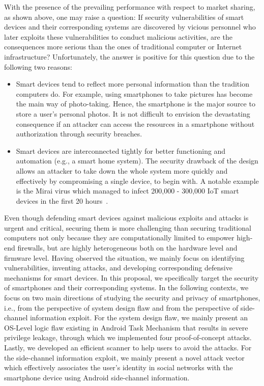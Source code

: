 \documentclass[letterpaper,12pt]{article}
\begin{document}
With the presence of the prevailing performance with respect to market sharing, as shown above, one may raise a question: If security vulnerabilities of smart devices and their corresponding systems are discovered by vicious personnel who later exploits these vulnerabilities to conduct malicious activities, are the consequences more serious than the ones of traditional computer or Internet infrastructure? Unfortunately, the answer is positive for this question due to the following two reasons:
\begin{itemize}
\item Smart devices tend to reflect more personal information than the tradition computers do. For example, using smartphones to take pictures has become the main way of photo-taking\cite{smartphonephoto}. Hence, the smartphone is the major source to store a user's personal photos. It is not difficult to envision the devastating consequence if an attacker can access the resources in a smartphone without authorization through security breaches.

\item Smart devices are interconnected tightly for better functioning and automation (e.g., a smart home system). The security drawback of the design allows an attacker to take down the whole system more quickly and effectively by compromising a single device, to begin with. A notable example is the Mirai virus which managed to infect 200,000 -
300,000 IoT smart devices in the first 20 hours~\cite{antonakakis2018mirai}.
\end{itemize}

Even though defending smart devices against malicious exploits and attacks is urgent and critical, securing them is more challenging than securing traditional computers not only because they are computationally limited to empower high-end firewalls, but are highly heterogeneous both on the hardware level and firmware level. Having observed the situation,  we mainly focus on identifying vulnerabilities, inventing attacks, and developing corresponding defensive mechanisms for smart devices. In this proposal, we specifically target the security of smartphones and their corresponding systems. In the following contexts, we focus on two main directions of studying the security and privacy of smartphones, i.e., from the perspective of system design flaw and from the perspective of side-channel information exploit. For the system design flaw, we mainly present an OS-Level logic flaw existing in Android Task Mechanism that results in severe privilege leakage, through which we implemented four proof-of-concept attacks. Lastly, we developed an efficient scanner to help users to avoid the attacks. For the side-channel information exploit, we mainly present a novel attack vector which effectively associates the user's identity in social networks with the smartphone device using Android side-channel information. 
\end{document}
